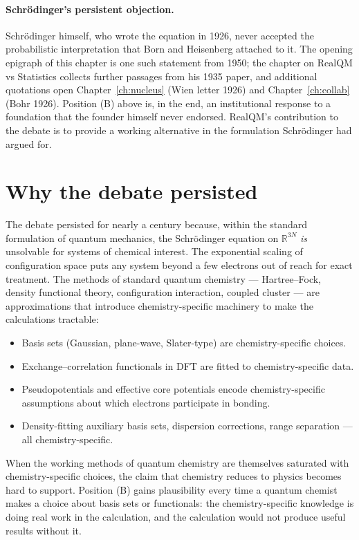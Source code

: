 \paragraph{Schr\"odinger's persistent objection.}
Schr\"odinger himself, who wrote the equation in 1926, never accepted the probabilistic interpretation that Born and Heisenberg attached to it. The opening epigraph of this chapter is one such statement from 1950; the chapter on RealQM vs Statistics collects further passages from his 1935 paper, and additional quotations open Chapter~\ref{ch:nucleus} (Wien letter 1926) and Chapter~\ref{ch:collab} (Bohr 1926). Position (B) above is, in the end, an institutional response to a foundation that the founder himself never endorsed. RealQM's contribution to the debate is to provide a working alternative in the formulation Schr\"odinger had argued for.

\section{Why the debate persisted}\label{sec:why-persisted}

The debate persisted for nearly a century because, within the standard formulation of quantum mechanics, the Schr\"odinger equation on $\mathbb{R}^{3N}$ \emph{is} unsolvable for systems of chemical interest. The exponential scaling of configuration space puts any system beyond a few electrons out of reach for exact treatment. The methods of standard quantum chemistry --- Hartree--Fock, density functional theory, configuration interaction, coupled cluster --- are approximations that introduce chemistry-specific machinery to make the calculations tractable:

\begin{itemize}
\item Basis sets (Gaussian, plane-wave, Slater-type) are chemistry-specific choices.
\item Exchange--correlation functionals in DFT are fitted to chemistry-specific data.
\item Pseudopotentials and effective core potentials encode chemistry-specific assumptions about which electrons participate in bonding.
\item Density-fitting auxiliary basis sets, dispersion corrections, range separation --- all chemistry-specific.
\end{itemize}

When the working methods of quantum chemistry are themselves saturated with chemistry-specific choices, the claim that chemistry reduces to physics becomes hard to support. Position (B) gains plausibility every time a quantum chemist makes a choice about basis sets or functionals: the chemistry-specific knowledge is doing real work in the calculation, and the calculation would not produce useful results without it.

